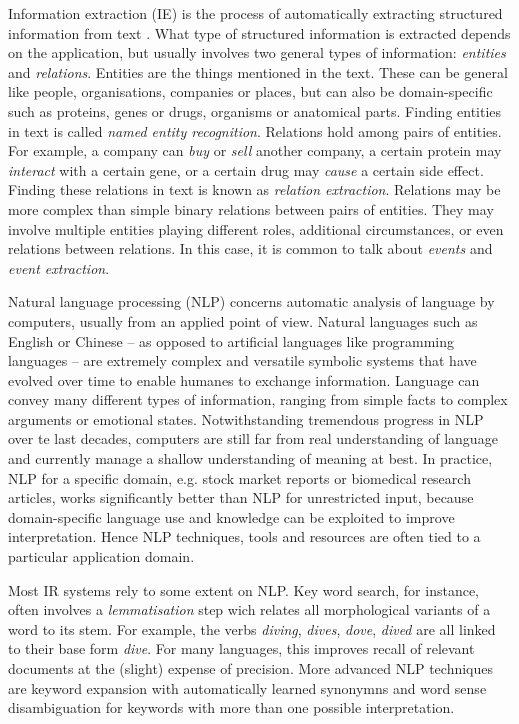 \documentclass[11pt,oneside,a4paper]{report}
\begin{document}
Information extraction (IE) is the process of automatically extracting structured information from text \citep{Jiang2012Information}.
What type of structured information is extracted depends on the application, but usually involves two general types of information: \emph{entities} and \emph{relations}.
Entities are the things mentioned in the text.
These can be general like people, organisations, companies or places, but can also be domain-specific such as proteins, genes or drugs, organisms or anatomical parts.
Finding entities in text is called \emph{named entity recognition}.
Relations hold among pairs of entities.
For example, a company can \emph{buy} or \emph{sell} another company, a certain protein may \emph{interact} with a certain gene, or a certain drug may \emph{cause} a certain side effect.
Finding these relations in text is known as \emph{relation extraction}.  
Relations may be more complex than simple binary relations between pairs of entities.
They may involve multiple entities playing different roles, additional circumstances, or even relations between relations.
In this case, it is common to talk about \emph{events} and \emph{event extraction}.

Natural language processing (NLP) concerns automatic analysis of language by computers, usually from an applied point of view.  
Natural languages such as English or Chinese -- as opposed to artificial languages like programming languages -- are extremely complex and versatile symbolic systems that have evolved over time to enable humanes to exchange information.
Language can convey many different types of information, ranging from simple facts to complex arguments or emotional states.
Notwithstanding tremendous progress in NLP over te last decades, computers are still far from real understanding of language and currently manage a shallow understanding of meaning at best.
In practice, NLP for a specific domain, e.g. stock market reports or biomedical research articles, works significantly better than NLP for unrestricted input, because domain-specific language use and knowledge can be exploited to improve interpretation. 
Hence NLP techniques, tools and resources are often tied to a particular application domain.

Most IR systems rely to some extent on NLP.
Key word search, for instance, often involves a \emph{lemmatisation} step wich relates all morphological variants of a word to its stem.
For example, the verbs \emph{diving}, \emph{dives}, \emph{dove}, \emph{dived} are all linked to their base form \emph{dive}.
For many languages, this improves recall of relevant documents at the (slight) expense of precision.
More advanced NLP techniques are keyword expansion with automatically learned synonymns and word sense disambiguation for keywords with more than one possible interpretation.  
\end{document}
